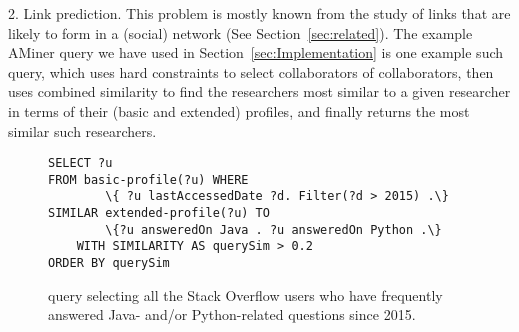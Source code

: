 
\textsf{2. Link prediction.} This problem is mostly known from the study of links that are likely to form in a (social) network (See Section~\ref{sec:related}). The example AMiner query we have used in Section~\ref{sec:Implementation} is one example such query, which uses hard constraints to select collaborators of collaborators, then uses combined similarity to find the researchers most similar to a given researcher in terms of their (basic and extended) profiles, and finally returns the most similar such researchers. 


\begin{figure}
{\scriptsize
\begin{Verbatim}
SELECT ?u
FROM basic-profile(?u) WHERE
        \{ ?u lastAccessedDate ?d. Filter(?d > 2015) .\}
SIMILAR extended-profile(?u) TO
        \{?u answeredOn Java . ?u answeredOn Python .\}
    WITH SIMILARITY AS querySim > 0.2
ORDER BY querySim
\end{Verbatim}
} \vspace{-2mm} \caption{\qlang{} query selecting all the Stack Overflow users who have frequently answered Java- and/or Python-related questions since 2015.} \label{fig:context}
\vspace{-4mm}
\end{figure}


